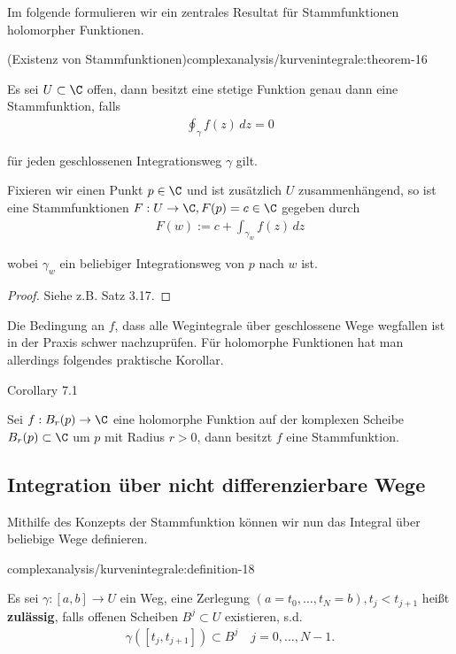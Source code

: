 \documentclass[letterpaper,10pt,german]{jupyterBook}
\begin{document}
\par
Im folgende formulieren wir ein zentrales Resultat für Stammfunktionen holomorpher Funktionen.
\begin{theorem}{(Existenz von Stammfunktionen)}{complexanalysis/kurvenintegrale:theorem-16}



\par
Es sei \(U\subset\C\) offen, dann besitzt eine stetige Funktion genau dann eine Stammfunktion, falls
\begin{align*}
\oint_\gamma f(z)\, dz =0
\end{align*}
\par
für jeden geschlossenen Integrationsweg \(\gamma\) gilt.

\par
Fixieren wir einen Punkt \(p\in\C\) und ist zusätzlich \(U\) zusammenhängend, so ist eine Stammfunktionen \(F:U\to\C, F(p)=c\in\C\) gegeben durch
\begin{align*}
F(w):= c+ \int_{\gamma_w} f(z) \,dz
\end{align*}
\par
wobei \(\gamma_w\) ein beliebiger Integrationsweg von \(p\) nach \(w\) ist.
\end{theorem}

\begin{proof}
 Siehe z.B. \cite{Nee17} Satz 3.17.
\end{proof}

\par
Die Bedingung an \(f\), dass alle Wegintegrale über geschlossene Wege wegfallen ist in der Praxis schwer nachzuprüfen. Für holomorphe Funktionen hat man allerdings folgendes praktische Korollar.
\label{complexanalysis/kurvenintegrale:corollary-17}
\begin{emphBox}{}{}{Corollary 7.1}



\par
Sei \(f:B_r(p)\to\C\) eine holomorphe Funktion auf der komplexen Scheibe \(B_r(p)\subset\C\) um \(p\) mit Radius \(r>0\), dann besitzt \(f\) eine Stammfunktion.
\end{emphBox}


\subsection{Integration über nicht differenzierbare Wege}
\label{\detokenize{complexanalysis/kurvenintegrale:integration-uber-nicht-differenzierbare-wege}}
\par
Mithilfe des Konzepts der Stammfunktion können wir nun das Integral über beliebige Wege definieren.
\begin{definition}{}{complexanalysis/kurvenintegrale:definition-18}



\par
Es sei \(\gamma:[a,b]\to U\) ein Weg, eine Zerlegung \((a=t_0,\ldots, t_N=b), t_j<t_{j+1}\) heißt \textbf{zulässig}, falls offenen Scheiben \(B^j\subset U\) existieren, s.d.
\begin{align*}
\gamma([t_j,t_{j+1}])\subset B^j\quad j=0,\ldots,N-1.
\end{align*}\end{definition}
\end{document}
